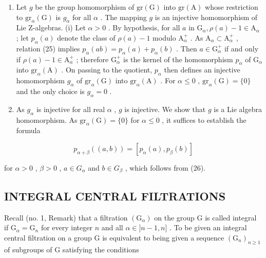 \begin{enumerate}
\def\labelenumi{(\roman{enumi})}
\setcounter{enumi}{1}
\item
  Let \(g\) be the group homomorphism of \(\mathrm{gr}(\mathrm{G})\) into \(\mathrm{gr}(\mathrm{A})\) whose restriction to \(\mathrm{gr}_{\alpha}(\mathrm{G})\) is \(g_{\alpha}\) for all \(\alpha\) . The mapping \(g\) is an injective homomorphism of Lie Z-algebras. (i) Let \(\alpha > 0\) . By hypothesis, for all \(a\) in \(\mathrm{G}_{\alpha}, \rho(a) - 1 \in \mathrm{A}_{\alpha}\) ; let \(p_{\alpha}(a)\) denote the class of \(\rho(a) - 1\) modulo \(\mathrm{A}_{\alpha}^{+}\) . As \(\mathrm{A}_{\alpha} \subset \mathrm{A}_{\alpha}^{+}\) , relation (25) implies \(p_{\alpha}(ab) = p_{\alpha}(a) + p_{\alpha}(b)\) . Then \(a \in \mathrm{G}_{\alpha}^{+}\) if and only if \(\rho(a) - 1 \in \mathrm{A}_{\alpha}^{+}\) ; therefore \(\mathrm{G}_{\alpha}^{+}\) is the kernel of the homomorphism \(p_{\alpha}\) of \(\mathrm{G}_{\alpha}\) into \(\mathrm{gr}_{\alpha}(\mathrm{A})\) . On passing to the quotient, \(p_{\alpha}\) then defines an injective homomorphism \(g_{\alpha}\) of \(\mathrm{gr}_{\alpha}(\mathrm{G})\) into \(\mathrm{gr}_{\alpha}(\mathrm{A})\) . For \(\alpha \leqslant 0\) , \(\mathrm{gr}_{\alpha}(\mathrm{G}) = \{0\}\) and the only choice is \(g_{\alpha} = 0\) .
\item
  As \(g_{\alpha}\) is injective for all real \(\alpha\) , \(g\) is injective. We show that \(g\) is a Lie algebra homomorphism. As \(\mathrm{gr}_{\alpha}(\mathrm{G}) = \{0\}\) for \(\alpha \leqslant 0\) , it suffices to establish the formula
\end{enumerate}

\[
p _ {\alpha + \beta} ((a, b)) = [ p _ {\alpha} (a), p _ {\beta} (b) ]\tag{27}
\]

for \(\alpha > 0\) , \(\beta > 0\) , \(a \in G_{\alpha}\) and \(b \in G_{\beta}\) , which follows from (26).

\subsection{INTEGRAL CENTRAL FILTRATIONS}

Recall (no. 1, Remark) that a filtration \((\mathrm{G}_{\alpha})\) on the group G is called integral if \(\mathrm{G}_{\alpha} = \mathrm{G}_{n}\) for every integer \(n\) and all \(\alpha \in ]n - 1,n]\) . To be given an integral central filtration on a group G is equivalent to being given a sequence \((\mathrm{G}_n)_{n\geqslant 1}\) of subgroups of G satisfying the conditions

